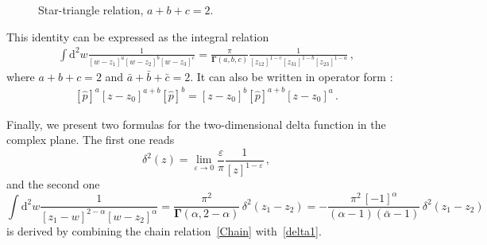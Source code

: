 \documentclass[a4paper,11pt]{article}
\numberwithin{equation}{section}
\begin{document}
\begin{figure}[h]
    \centering
    \caption{Star-triangle relation, $a+b+c=2$.}
    \label{Rules}
\end{figure}

This identity can be expressed as the integral relation
\begin{align}\label{Star}
\int \mathrm{d}^2 w \frac{1}{[w-z_1]^a[w-z_2]^b [w-z_3]^c}
 = \frac{\pi}{\mathbf{\Gamma}(a,b,c)}
\frac{1}{[z_{12}]^{1-c}[z_{31}]^{1-b}[z_{23}]^{1-a}} \,,
\end{align}
where $a+b+c=2$ and $\bar a+\bar b+\bar c=2$.
It can also be written in operator form \cite{DM09,DM14,Isa}:
\begin{align}\label{star-tr}
[\hat{p}]^{a} [z-z_0]^{a+b} [\hat{p}]^{b} =
[z-z_0]^{b} [\hat{p}]^{a+b} [z-z_0]^{a} \,.
\end{align}

Finally, we present two formulas for the two-dimensional delta function in the complex plane. The first one reads
\begin{equation}\label{delta1}
    \delta^2(z) = \lim_{\varepsilon\to 0}\frac{\varepsilon}{\pi} \frac{1}{[z]^{1-\varepsilon}} \,,
\end{equation}
and the second one
\begin{equation} \label{delta2}
    \int \mathrm{d}^2 w \frac{1}{[z_1-w]^{2-\alpha}[w-z_2]^\alpha} =
    \frac{\pi^2}{\mathbf{\Gamma}(\alpha,2-\alpha)} \, \delta^2(z_1-z_2)
    = -\frac{\pi^2\,[-1]^\alpha}{(\alpha-1)(\bar{\alpha}-1)} \, \delta^2(z_1-z_2)
\end{equation}
is derived by combining the chain relation~\eqref{Chain} with~\eqref{delta1}.
\end{document}
